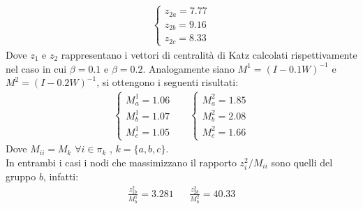 \documentclass[11pt,largemargins]{homework}
\begin{document}
\begin{alphaparts}
\begin{align*}
\begin{cases}
      z_{2a} = 7.77 \\
      z_{2b} = 9.16 \\
      z_{2c} = 8.33
    \end{cases}
  \end{align*}
  Dove \(z_1\) e \(z_2\) rappresentano i vettori di centralità di Katz calcolati rispettivamente nel caso in cui \(\beta = 0.1\) e \(\beta = 0.2\). Analogamente siano \(M^1 = (I-0.1W)^{-1}\) e \(M^2 = (I-0.2W)^{-1}\), si ottengono i seguenti risultati:
  \begin{align*}
    \begin{cases}
      M^1_a = 1.06\\
      M^1_b = 1.07\\
      M^1_c = 1.05
    \end{cases} &&
    \begin{cases}
      M^2_a = 1.85\\
      M^2_b = 2.08\\
      M^2_c = 1.66
    \end{cases}
  \end{align*}
  Dove \(M_{ii} = M_k \) \(\forall i \in \pi_k\) , \(k=\{a,b,c\}\).\\
  In entrambi i casi i nodi che massimizzano il rapporto \(z_i^2 / M_{ii}\) sono quelli del gruppo \(b\), infatti:
  \begin{align*}
    \frac{z_{1b}^2}{M_b^1}=3.281 && \frac{z_{2b}^2}{M_b^2}=40.33 
  \end{align*}


\end{alphaparts}
\end{document}
